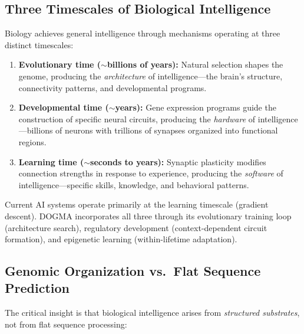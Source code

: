 \subsection{Three Timescales of Biological Intelligence}

Biology achieves general intelligence through mechanisms operating at three distinct timescales:

\begin{enumerate}[leftmargin=1.8em]
  \item \textbf{Evolutionary time ($\sim$billions of years):} Natural selection shapes the genome, producing the \emph{architecture} of intelligence---the brain's structure, connectivity patterns, and developmental programs.

  \item \textbf{Developmental time ($\sim$years):} Gene expression programs guide the construction of specific neural circuits, producing the \emph{hardware} of intelligence---billions of neurons with trillions of synapses organized into functional regions.

  \item \textbf{Learning time ($\sim$seconds to years):} Synaptic plasticity modifies connection strengths in response to experience, producing the \emph{software} of intelligence---specific skills, knowledge, and behavioral patterns.
\end{enumerate}

Current AI systems operate primarily at the learning timescale (gradient descent). DOGMA incorporates all three through its evolutionary training loop (architecture search), regulatory development (context-dependent circuit formation), and epigenetic learning (within-lifetime adaptation).

\subsection{Genomic Organization vs.\ Flat Sequence Prediction}

The critical insight is that biological intelligence arises from \emph{structured substrates}, not from flat sequence processing:

